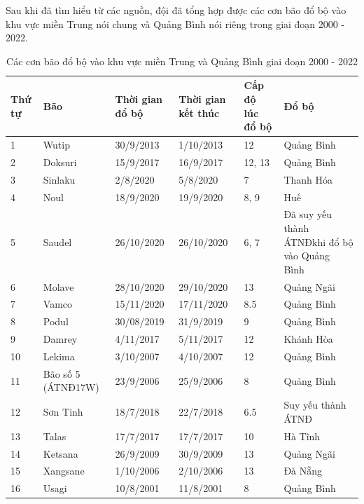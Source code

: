 \documentclass[12pt]{report}
\begin{document}
\begin{flushleft}
	Sau khi đã tìm hiểu từ các nguồn, đội đã tổng hợp được các cơn bão đổ bộ vào khu vực miền Trung nói chung và Quảng Bình nói riêng trong giai đoạn 2000 - 2022.
	\\[\baselineskip]

	\begin{table}[!ht]
		\captionsetup{justification = centering}
		\caption{Các cơn bão đổ bộ vào khu vực miền Trung và Quảng Bình giai đoạn 2000 - 2022}
		\begin{adjustbox}{width = 1.2\linewidth, center}
		\begin{tabular}{|l|l|l|l|l|l|}
		\hline
			Thứ tự & Bão & Thời gian đổ bộ & Thời gian kết thúc & Cấp độ lúc đổ bộ & Đổ bộ \\ \hline
			1 & Wutip & 30/9/2013 & 1/10/2013 & 12 & Quảng Bình \\ \hline
			2 & Doksuri & 15/9/2017 & 16/9/2017 & 12, 13 & Quảng Bình \\ \hline
			3 & Sinlaku & 2/8/2020 & 5/8/2020 & 7 & Thanh Hóa \\ \hline
			4 & Noul & 18/9/2020 & 19/9/2020 & 8, 9 & Huế \\ \hline
			5 & Saudel & 26/10/2020 & 26/10/2020 & 6, 7 & Đã suy yếu thành ÁTNĐ\footnotemark[1] khi đổ bộ vào Quảng Bình \\ \hline
			6 & Molave & 28/10/2020 & 29/10/2020 & 13 & Quảng Ngãi \\ \hline
			7 & Vamco & 15/11/2020 & 17/11/2020 & 8.5 & Quảng Bình \\ \hline
			8 & Podul & 30/08/2019 & 31/9/2019 & 9 & Quảng Bình \\ \hline
			9 & Damrey & 4/11/2017 & 5/11/2017 & 12 & Khánh Hòa \\ \hline
			10 & Lekima & 3/10/2007 & 4/10/2007 & 12 & Quảng Bình \\ \hline
			11 & Bão số 5 (ÁTNĐ\footnotemark[1] 17W) & 23/9/2006 & 25/9/2006 & 8 & Quảng Bình \\ \hline
			12 & Sơn Tinh & 18/7/2018 & 22/7/2018 & 6.5 & Suy yếu thành ÁTNĐ\footnotemark[1] \\ \hline
			13 & Talas & 17/7/2017 & 17/7/2017 & 10 & Hà Tĩnh \\ \hline
			14 & Ketsana & 26/9/2009 & 30/9/2009 & 13 & Quảng Ngãi \\ \hline
			15 & Xangsane & 1/10/2006 & 2/10/2006 & 13 & Đà Nẵng \\ \hline
			16 & Usagi & 10/8/2001 & 11/8/2001 & 8 & Quảng Bình \\ \hline

\end{tabular}
\end{adjustbox}
\end{table}
\end{flushleft}
\end{document}
